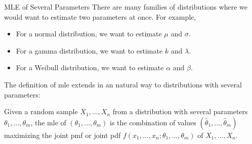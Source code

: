 \documentclass[handout]{beamer}
\begin{document}
\begin{frame}{MLE of Several Parameters}
There are many families of distributions where we would want to estimate two parameters at once. For example,
\begin{itemize}
\item For a normal distribution, we want to estimate $\mu$ and $\sigma$.
\item For a gamma distribution, we want to estimate $k$ and $\lambda$.
\item For a Weibull distribution, we want to estimate $\alpha$ and $\beta$.
\end{itemize}
\pause The definition of mle extends in an natural way to distributions with several parameters:
\pause \begin{block}{}
Given a random sample $X_1,\dots,X_n$ from a distribution with several parameters $\theta_1,\dots,\theta_m$, the mle of $(\theta_1,\dots,\theta_m)$ is the combination of values $(\hat\theta_1,\dots,\hat\theta_m)$ maximizing the joint pmf or joint pdf $f(x_1,\dots,x_n ; \theta_1,\dots,\theta_m)$ of $X_1,\dots,X_n$.
\end{block}
\end{frame}
\end{document}
